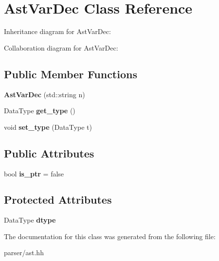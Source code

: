 \hypertarget{classAstVarDec}{}\section{Ast\+Var\+Dec Class Reference}
\label{classAstVarDec}


Inheritance diagram for Ast\+Var\+Dec\+:


Collaboration diagram for Ast\+Var\+Dec\+:
\subsection*{Public Member Functions}
\begin{DoxyCompactItemize}
\item 
\mbox{\label{classAstVarDec_ae9c33b397ba6590f5e78e98d96cb5854}} 
{\bfseries Ast\+Var\+Dec} (std\+::string n)
\item 
\mbox{\label{classAstVarDec_a18e1230faab34e3f0e09e5c244e68473}} 
Data\+Type {\bfseries get\+\_\+type} ()
\item 
\mbox{\label{classAstVarDec_a2b6c3a4b48f0be257646e887dbe99617}} 
void {\bfseries set\+\_\+type} (Data\+Type t)
\end{DoxyCompactItemize}
\subsection*{Public Attributes}
\begin{DoxyCompactItemize}
\item 
\mbox{\label{classAstVarDec_a4e8a70f5d99a5eb708b11f9863c96ae1}} 
bool {\bfseries is\+\_\+ptr} = false
\end{DoxyCompactItemize}
\subsection*{Protected Attributes}
\begin{DoxyCompactItemize}
\item 
\mbox{\label{classAstVarDec_ad16fa6146076a0ececb0a299928a10fe}} 
Data\+Type {\bfseries dtype}
\end{DoxyCompactItemize}


The documentation for this class was generated from the following file\+:\begin{DoxyCompactItemize}
\item 
parser/ast.\+hh\end{DoxyCompactItemize}
